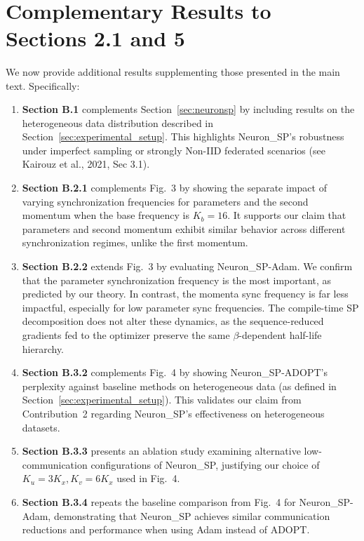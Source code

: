 \documentclass{article}
\begin{document}
\
\section{Complementary Results to Sections 2.1 and 5}
\label{sec:complementary}

We now provide additional results supplementing those presented in the main text. Specifically:

\begin{enumerate}
\item \textbf{Section B.1} complements Section~\ref{sec:neuronsp} by including results on the heterogeneous data distribution described in Section~\ref{sec:experimental_setup}. This highlights Neuron\_SP's robustness under imperfect sampling or strongly Non-IID federated scenarios (see Kairouz et al., 2021, Sec 3.1).
\item \textbf{Section B.2.1} complements Fig.~3 by showing the separate impact of varying synchronization frequencies for parameters and the second momentum when the base frequency is $K_b=16$. It supports our claim that parameters and second momentum exhibit similar behavior across different synchronization regimes, unlike the first momentum.
\item \textbf{Section B.2.2} extends Fig.~3 by evaluating Neuron\_SP-Adam. We confirm that the parameter synchronization frequency is the most important, as predicted by our theory. In contrast, the momenta sync frequency is far less impactful, especially for low parameter sync frequencies. The compile-time SP decomposition does not alter these dynamics, as the sequence-reduced gradients fed to the optimizer preserve the same $\beta$-dependent half-life hierarchy.
\item \textbf{Section B.3.2} complements Fig.~4 by showing Neuron\_SP-ADOPT's perplexity against baseline methods on heterogeneous data (as defined in Section~\ref{sec:experimental_setup}). This validates our claim from Contribution~2 regarding Neuron\_SP's effectiveness on heterogeneous datasets.
\item \textbf{Section B.3.3} presents an ablation study examining alternative low-communication configurations of Neuron\_SP, justifying our choice of $K_u=3K_x, K_v=6K_x$ used in Fig.~4.
\item \textbf{Section B.3.4} repeats the baseline comparison from Fig.~4 for Neuron\_SP-Adam, demonstrating that Neuron\_SP achieves similar communication reductions and performance when using Adam instead of ADOPT.

\end{enumerate}
\end{document}
